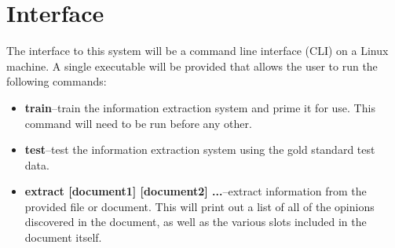 \documentclass{article}
\begin{document}
    \section{Interface}

    The interface to this system will be a command line interface (CLI) on a Linux machine. A single executable will be provided that allows the user to run the following commands:

    \begin{itemize}
    	\item \textbf{train}--train the information extraction system and prime it for use. This command will need to be run before any other.
        \item \textbf{test}--test the information extraction system using the gold standard test data.
        \item \textbf{extract \textnormal{[document1] [document2] ...}}--extract information from the provided file or document. This will print out a list of all of the opinions discovered in the document, as well as the various slots included in the document itself.
    \end{itemize}

\end{document}
